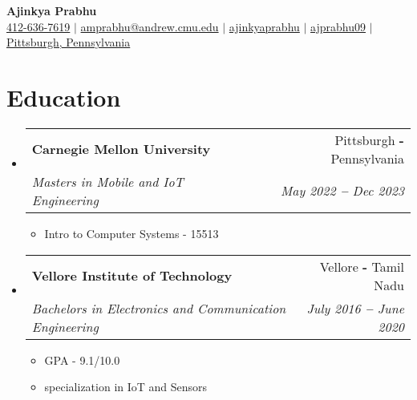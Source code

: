 \documentclass[12pt]{article}
\makeatletter
\newcommand{\resumeItem}[1]{
  \item\small{
    {#1}
  } 
  \vspace{-3pt}
}
\newcommand{\resumeSubheading}[4]{
  \item
    \begin{tabular*}{0.97\textwidth}[t]{l@{\extracolsep{\fill}}r}
      \textbf{\small#1} & \small#2 \\
      \textit{\small#3} & \textit{\small #4} \\
    \end{tabular*}
}
\newcommand{\resumeSubHeadingListStart}{\begin{itemize}[leftmargin=0.15in, label={}]}
\newcommand{\resumeSubHeadingListEnd}{\end{itemize}}
\newcommand{\resumeItemListStart}{\begin{itemize}\vspace{-8pt}}
\newcommand{\resumeItemListEnd}{\end{itemize}\vspace{-8pt}}
\makeatother
\begin{document}

\begin{flushleft}
    \textbf{\Large Ajinkya Prabhu} \\ \vspace{2 pt}
    \small
    \faMobile \hspace{.5pt} \href{tel:+1 412-636-7619}{412-636-7619}
    $|$
    \small
    \faAt \hspace{.5pt} \href{mailto:amprabhu@andrew.cmu.edu}{amprabhu@andrew.cmu.edu}
    $|$
    \small
    \faLinkedinSquare \hspace{.5pt} \href{https://www.linkedin.com/in/ajinkyaprabhu/}{ajinkyaprabhu}
    $|$
    \small
    \faGithub \hspace{.5pt} \href{https://github.com/ajprabhu09}{ajprabhu09}
    $|$
    \faMapMarker \hspace{.5pt} \href{https://goo.gl/maps/nDiixFmLt41dn9vq9} {Pittsburgh, Pennsylvania}
\end{flushleft}




    
   
\section{Education}
    \resumeSubHeadingListStart
    \resumeSubheading
      {Carnegie Mellon University}{Pittsburgh \textbf{-} Pennsylvania}
      {Masters in Mobile and IoT Engineering}{May 2022 \textbf{--} Dec 2023}
        \resumeItemListStart
            \resumeItem{Intro to Computer Systems - 15513}
        \resumeItemListEnd
    
    \resumeSubheading
      {Vellore Institute of Technology}{Vellore \textbf{-} Tamil Nadu}
      {Bachelors in Electronics and Communication Engineering}{July 2016 \textbf{--} June 2020}
        \resumeItemListStart
            \resumeItem{GPA - 9.1/10.0}
            \resumeItem{specialization in IoT and Sensors}
        \resumeItemListEnd 
    \resumeSubHeadingListEnd
    \vspace{0pt}
\end{document}
